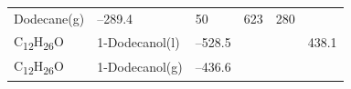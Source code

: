 \documentclass[
  9pt,
]{extbook}
\theoremstyle{definition}
\theoremstyle{definition}
\theoremstyle{definition}
\theoremstyle{remark}
\begin{document}
\begin{longtable}[]{@{}llllll@{}}
\begin{minipage}[t]{0.17\columnwidth}
Dodecane(g)\strut
\end{minipage} & \begin{minipage}[t]{0.15\columnwidth}\raggedright
--289.4\strut
\end{minipage} & \begin{minipage}[t]{0.15\columnwidth}\raggedright
50\strut
\end{minipage} & \begin{minipage}[t]{0.14\columnwidth}\raggedright
623\strut
\end{minipage} & \begin{minipage}[t]{0.14\columnwidth}\raggedright
280\strut
\end{minipage}\tabularnewline
\begin{minipage}[t]{0.07\columnwidth}\raggedright
C\textsubscript{12}H\textsubscript{26}O\strut
\end{minipage} & \begin{minipage}[t]{0.17\columnwidth}\raggedright
1-Dodecanol(l)\strut
\end{minipage} & \begin{minipage}[t]{0.15\columnwidth}\raggedright
--528.5\strut
\end{minipage} & \begin{minipage}[t]{0.15\columnwidth}\raggedright
\strut
\end{minipage} & \begin{minipage}[t]{0.14\columnwidth}\raggedright
\strut
\end{minipage} & \begin{minipage}[t]{0.14\columnwidth}\raggedright
438.1\strut
\end{minipage}\tabularnewline
\begin{minipage}[t]{0.07\columnwidth}\raggedright
C\textsubscript{12}H\textsubscript{26}O\strut
\end{minipage} & \begin{minipage}[t]{0.17\columnwidth}\raggedright
1-Dodecanol(g)\strut
\end{minipage} & \begin{minipage}[t]{0.15\columnwidth}\raggedright
--436.6\strut
\end{minipage} & \begin{minipage}[t]{0.15\columnwidth}\raggedright
\strut
\end{minipage} & \begin{minipage}[t]{0.14\columnwidth}\raggedright
\strut
\end{minipage} & \begin{minipage}[t]{0.14\columnwidth}\raggedright

\end{minipage}
\end{longtable}
\end{document}
